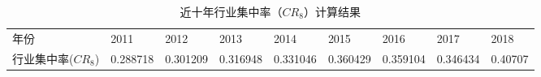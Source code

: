 \begin{table}[H]
    \centering
    \caption{近十年行业集中率（$CR_8$）计算结果}
    \label{cr8.1}
    \setlength{\leftskip}{-60pt}
    \begin{tabular}{lllllllll}
        \toprule
        年份               & 2011     & 2012     & 2013     & 2014     & 2015     & 2016     & 2017     & 2018                \\
        行业集中率($CR_8$) & 0.288718 & 0.301209 & 0.316948 & 0.331046 & 0.360429 & 0.359104 & 0.346434 & 0.40707    \\
        \bottomrule
    \end{tabular}
\end{table}
